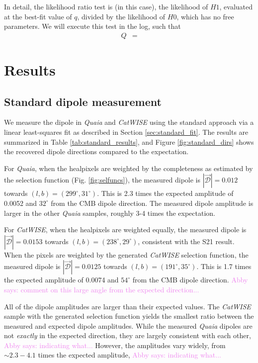 \documentclass[modern]{aastex631}
\newcommand{\abby}[1]{\textcolor{violet}{Abby says: #1}}
\newcommand{\catwise}{\textsl{CatWISE}\xspace}
\newcommand{\quaia}{\textsl{Quaia}\xspace}
\begin{document}
In detail, the likelihood ratio test is (in this case), the likelihood of $H1$, evaluated at the best-fit value of $q$, divided by the likelihood of $H0$, which has no free parameters.
We will execute this test in the log, such that
\begin{align}
    Q &= 
\end{align}


\section{Results}
\label{sec:results}

\subsection{Standard dipole measurement}
\label{sec:standard_results}

We measure the dipole in \quaia and \catwise using the standard approach via a linear least-squares fit as described in Section \ref{sec:standard_fit}.
The results are summarized in Table \ref{tab:standard_results}, and Figure \ref{fig:standard_dirs} shows the recovered dipole directions compared to the expectation.

For \quaia, when the healpixels are weighted by the completeness as estimated by the selection function (Fig. \ref{fig:selfuncs}), the measured dipole is $|\vec{\mathcal{D}}|=0.012$ towards $(l,b)=(299^\circ,31^\circ)$.
This is 2.3 times the expected amplitude of 0.0052 and $32^\circ$ from the CMB dipole direction.
The measured dipole amplitude is larger in the other \quaia samples, roughly 3-4 times the expectation.

For \catwise, when the healpixels are weighted equally, the measured dipole is $|\vec{\mathcal{D}}|=0.0153$ towards $(l,b)=(238^\circ,29^\circ)$, consistent with the S21 result.
When the pixels are weighted by the generated \catwise selection function, the measured dipole is $|\vec{\mathcal{D}}|=0.0125$ towards $(l,b)=(191^\circ,35^\circ)$.
This is 1.7 times the expected amplitude of 0.0074 and $54^\circ$ from the CMB dipole direction.
\abby{comment on this large angle from the expected direction...}

All of the dipole amplitudes are larger than their expected values.
The \catwise sample with the generated selection function yields the smallest ratio between the measured and expected dipole amplitudes.
While the measured \quaia dipoles are not \emph{exactly} in the expected direction, they are largely consistent with each other, \abby{indicating what...}
However, the amplitudes vary widely, from $\sim 2.3-4.1$ times the expected amplitude, \abby{indicating what...}
\end{document}
